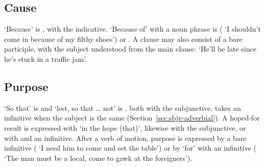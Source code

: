 \subsection{Cause}
`Because' is , with the indicative. `Because of' with a noun phrase is  ( `I shouldn't come in because of my filthy shoes') or .
A  clause may also consist of a bare participle, with the subject understood from the main clause:  `He'll be late since he's stuck in a traffic jam'.

\subsection{Purpose}
`So that' is  and `lest, so that \ldots{} not' is , both with the subjunctive.  takes an infinitive when the subject is the same (Section~\ref{sec:sbjv-adverbial}). A hoped-for result is expressed with  `in the hope (that)', likewise with the subjunctive, or with  and an infinitive.
After a verb of motion, purpose is expressed by a bare infinitive ( `I need him to come and set the table') or by  `for' with an infinitive ( `The man must be a local, come to gawk at the foreigners').

